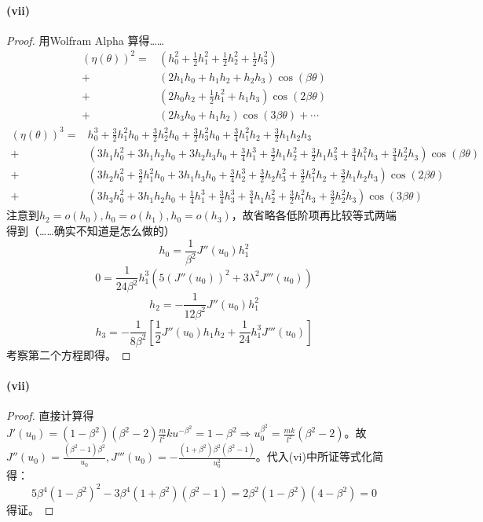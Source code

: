 \documentclass{ctexart}
\begin{document}
\paragraph{(vii)}
\begin{proof}
  用Wolfram Alpha 算得……
  \[\begin{aligned}
      (\eta(\theta))^{2}=&(h_{0}^{2}+\frac{1}{2}h_{1}^{2}+\frac{1}{2}h_{2}^{2}+\frac{1}{2}h_{3}^{2})\\
      +&(2h_{1}h_{0}+h_{1}h_{2}+h_{2}h_{3})\cos(\beta\theta)\\
      +&(2h_{0}h_{2}+\frac{1}{2}h_{1}^{2}+h_{1}h_{3})\cos(2\beta\theta)\\
      +&(2h_{3}h_{0}+h_{1}h_{2})\cos(3\beta\theta)+\cdots
    \end{aligned}
  \]
  \[\begin{aligned}
      (\eta(\theta))^{3}=& h_0^3 + \frac{3}{2} h_1^2 h_0 + \frac{3}{2} h_2^2 h_0 + \frac{3}{2} h_3^2 h_0 + \frac{3}{4} h_1^2 h_2 + \frac{3}{2} h_1 h_2 h_3\\
      +&(3h_{1}h_{0}^{2}+3h_{1}h_{2}h_{0}+3h_{2}h_{3}h_{0}+\frac{3}{4}h_{1}^{3}+\frac{3}{2}h_{1}h_{2}^{2}+\frac{3}{2}h_{1}h_{3}^{2}+\frac{3}{4}h_{1}^{2}h_{3}+\frac{3}{4}h_{2}^{2}h_{3})\cos(\beta\theta)\\
      +&(3h_{2}h_{0}^{2}+\frac{3}{2}h_{1}^{2}h_{0}+3h_{1}h_{3}h_{0}+\frac{3}{4}h_{2}^{3}+\frac{3}{2}h_{2}h_{3}^{2}+\frac{3}{2}h_{1}^{2}h_{2}+\frac{3}{2}h_{1}h_{2}h_{3})\cos(2\beta\theta)\\
      +&(3h_{3}h_{0}^{2}+3h_{1}h_{2}h_{0}+\frac{1}{4}h_{1}^{3}+\frac{3}{4}h_{3}^{3}+\frac{3}{4}h_{1}h_{2}^{2}+\frac{3}{2}h_{1}^{2}h_{3}+\frac{3}{2}h_{2}^{2}h_{3})\cos(3\beta\theta)
    \end{aligned}
  \]
  注意到$h_{2}=o(h_{0}),h_{0}=o(h_{1}),h_{0}=o(h_{3})$，故省略各低阶项再比较等式两端得到（……确实不知道是怎么做的）
  \[h_{0}=\frac{1}{\beta^{2}}J''(u_{0})h_{1}^{2}\]
  \[0=\frac{1}{24\beta^{2}}h_{1}^{3}(5(J''(u_{0}))^{2}+3\lambda^{2}J'''(u_{0}))\]
  \[h_{2}=-\frac{1}{12\beta^{2}}J''(u_{0})h_{1}^{2}\]
  \[h_{3}=-\frac{1}{8\beta^{2}}[\frac{1}{2}J''(u_{0})h_{1}h_{2}+\frac{1}{24}h_{1}^{3}J'''(u_{0})]\]
  考察第二个方程即得。
\end{proof}

\paragraph{(vii)}
\begin{proof}
  直接计算得$J'(u_{0})=(1-\beta^{2})(\beta^{2}-2)\frac{m}{l^{2}}ku^{-\beta^{2}}=1-\beta^{2}\Rightarrow u_{0}^{\beta^{2}}=\frac{mk}{l^{2}}(\beta^{2}-2)$。故$J''(u_{0})=\frac{(\beta^{2}-1)\beta^{2}}{u_{0}}, J'''(u_{0})=-\frac{(1+\beta^{2})\beta^{2}(\beta^{2}-1)}{u_{0}^{2}}$。代入(vi)中所证等式化简得：
  \[5\beta^{4}(1-\beta^{2})^{2}-3\beta^{4}(1+\beta^{2})(\beta^{2}-1)=2\beta^{2}(1-\beta^{2})(4-\beta^{2})=0\]
  得证。
\end{proof}
\end{document}
